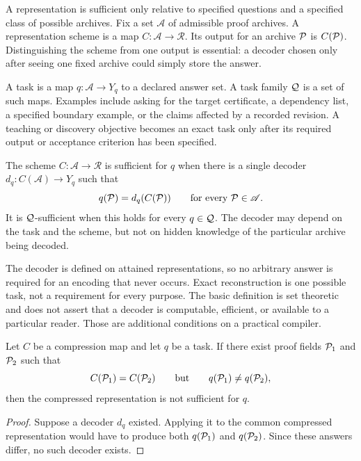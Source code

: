 A representation is sufficient only relative to specified questions and a specified class of possible archives. Fix a set $\mathscr A$ of admissible proof archives. A representation scheme is a map $C:\mathscr A\to\mathscr R$. Its output for an archive $\mathcal P$ is $C(\mathcal P)$. Distinguishing the scheme from one output is essential: a decoder chosen only after seeing one fixed archive could simply store the answer.

\begin{PPTdefinition}[Task]
\label{PPT:res:7:1}
A task is a map $q:\mathscr A\to Y_q$ to a declared answer set. A task family $\mathcal Q$ is a set of such maps. Examples include asking for the target certificate, a dependency list, a specified boundary example, or the claims affected by a recorded revision. A teaching or discovery objective becomes an exact task only after its required output or acceptance criterion has been specified.
\end{PPTdefinition}

\begin{PPTdefinition}
\label{PPT:res:7:2}
The scheme $C:\mathscr A\to\mathscr R$ is sufficient for $q$ when there is a single decoder $d_q:C(\mathscr A)\to Y_q$ such that
\[
q(\mathcal P)=d_q(C(\mathcal P))\qquad\text{for every }\mathcal P\in\mathscr A.
\]
It is $\mathcal Q$-sufficient when this holds for every $q\in\mathcal Q$. The decoder may depend on the task and the scheme, but not on hidden knowledge of the particular archive being decoded.
\end{PPTdefinition}

The decoder is defined on attained representations, so no arbitrary answer is required for an encoding that never occurs. Exact reconstruction is one possible task, not a requirement for every purpose. The basic definition is set theoretic and does not assert that a decoder is computable, efficient, or available to a particular reader. Those are additional conditions on a practical compiler.

\begin{PPTtheorem}
\label{PPT:res:7:3}
Let $C$ be a compression map and let $q$ be a task. If there exist proof fields $\mathcal P_1$ and $\mathcal P_2$ such that
\[
C(\mathcal P_1)=C(\mathcal P_2)
\qquad\text{but}\qquad
q(\mathcal P_1)\ne q(\mathcal P_2),
\]
then the compressed representation is not sufficient for $q$.
\end{PPTtheorem}

\begin{proof}
Suppose a decoder $d_q$ existed. Applying it to the common compressed representation would have to produce both $q(\mathcal P_1)$ and $q(\mathcal P_2)$. Since these answers differ, no such decoder exists.
\end{proof}

